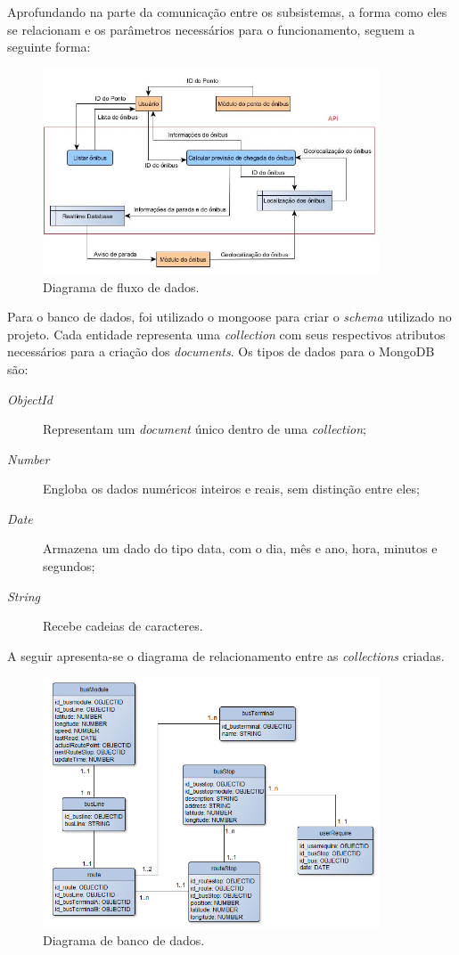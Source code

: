 \documentclass[
	12pt,				%
	oneside,			%
	a4paper,			%
	brazil				%
]{abntex2}
\begin{document}
{Aprofundando na parte da comunicação entre os subsistemas, a forma como eles se relacionam e os parâmetros necessários para o funcionamento, seguem a seguinte forma:

\begin{figure}[!h]
\centering
\includegraphics[width=10cm, center]{images/data-flux.jpg}
\caption{Diagrama de fluxo de dados.}
\label{Rotulo}
\end{figure}


Para o banco de dados, foi utilizado o mongoose para criar o \textit{schema} utilizado no projeto. Cada entidade representa uma \textit{collection} com seus respectivos atributos necessários para a criação dos \textit{documents}. Os tipos de dados para o MongoDB são:

\begin{description}
\item[\textit{ObjectId}] Representam um \textit{document} único dentro de uma \textit{collection};
\item[\textit{Number}] Engloba os dados numéricos inteiros e reais, sem distinção entre eles;
\item[\textit{Date}] Armazena um dado do tipo data, com o dia, mês e ano, hora, minutos e segundos;
\item[\textit{String}] Recebe cadeias de caracteres.
\end{description}

A seguir apresenta-se o diagrama de relacionamento entre as \textit{collections} criadas.

\begin{figure}[!h]
\centering
\includegraphics[width=10cm, center]{images/database-api.png}
\caption{Diagrama de banco de dados.}
\label{Rotulo}
\end{figure}

}
\end{document}
